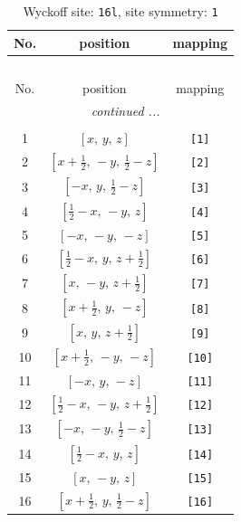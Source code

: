 \documentclass[fleqn,8pt]{jsarticle}
\begin{document}
\begin{longtable}{ccc}
\caption{Wyckoff site: {\tt 16l}, site symmetry: {\tt 1}}
 \\
 \hline \hline
No. & position & mapping \\ \hline \endfirsthead

\multicolumn{2}{l}{\tablename\ \thetable{}} \\
 \hline \hline
No. & position & mapping \\ \hline \endhead

 \hline \hline
\multicolumn{2}{r}{\footnotesize\it continued ...} \\ \endfoot

 \hline \hline
\multicolumn{2}{r}{} \\ \endlastfoot

1 & $\left[ x,\, y,\, z \right]$ & {\tt [1]} \\ \hline
2 & $\left[ x + \frac{1}{2},\, - y,\, \frac{1}{2} - z \right]$ & {\tt [2]} \\ \hline
3 & $\left[ - x,\, y,\, \frac{1}{2} - z \right]$ & {\tt [3]} \\ \hline
4 & $\left[ \frac{1}{2} - x,\, - y,\, z \right]$ & {\tt [4]} \\ \hline
5 & $\left[ - x,\, - y,\, - z \right]$ & {\tt [5]} \\ \hline
6 & $\left[ \frac{1}{2} - x,\, y,\, z + \frac{1}{2} \right]$ & {\tt [6]} \\ \hline
7 & $\left[ x,\, - y,\, z + \frac{1}{2} \right]$ & {\tt [7]} \\ \hline
8 & $\left[ x + \frac{1}{2},\, y,\, - z \right]$ & {\tt [8]} \\ \hline
9 & $\left[ x,\, y,\, z + \frac{1}{2} \right]$ & {\tt [9]} \\ \hline
10 & $\left[ x + \frac{1}{2},\, - y,\, - z \right]$ & {\tt [10]} \\ \hline
11 & $\left[ - x,\, y,\, - z \right]$ & {\tt [11]} \\ \hline
12 & $\left[ \frac{1}{2} - x,\, - y,\, z + \frac{1}{2} \right]$ & {\tt [12]} \\ \hline
13 & $\left[ - x,\, - y,\, \frac{1}{2} - z \right]$ & {\tt [13]} \\ \hline
14 & $\left[ \frac{1}{2} - x,\, y,\, z \right]$ & {\tt [14]} \\ \hline
15 & $\left[ x,\, - y,\, z \right]$ & {\tt [15]} \\ \hline
16 & $\left[ x + \frac{1}{2},\, y,\, \frac{1}{2} - z \right]$ & {\tt [16]} \\
\end{longtable}
\end{document}

